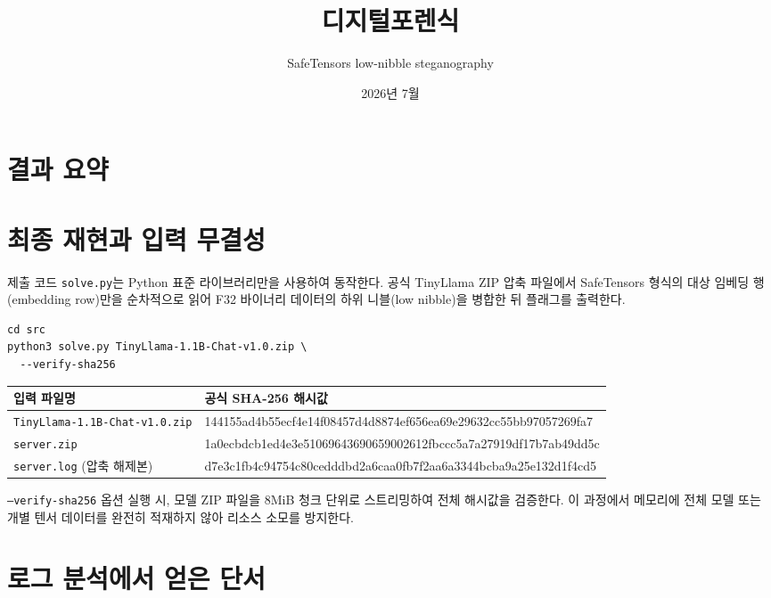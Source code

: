 \documentclass[10pt,a4paper]{article}
\title{디지털포렌식}
\author{SafeTensors low-nibble steganography}
\date{2026년 7월}
\begin{document}
\maketitle

\section*{결과 요약}

\begin{center}
\end{center}

\section{최종 재현과 입력 무결성}

제출 코드 \texttt{solve.py}는 Python 표준 라이브러리만을 사용하여 동작한다. 공식 TinyLlama ZIP 압축 파일에서 SafeTensors 형식의 대상 임베딩 행(embedding row)만을 순차적으로 읽어 F32 바이너리 데이터의 하위 니블(low nibble)을 병합한 뒤 플래그를 출력한다.

\begin{lstlisting}
cd src
python3 solve.py TinyLlama-1.1B-Chat-v1.0.zip \
  --verify-sha256
\end{lstlisting}

\begin{tabularx}{\linewidth}{@{}lX@{}}
\toprule
입력 파일명 & 공식 SHA-256 해시값\\
\midrule
\texttt{TinyLlama-1.1B-Chat-v1.0.zip} &
\ttfamily\footnotesize
144155ad4b55ecf4e14f08457d4d8874ef656ea69e29632cc55bb97057269fa7\\
\texttt{server.zip} &
\ttfamily\footnotesize
1a0ecbdcb1ed4e3e51069643690659002612fbccc5a7a27919df17b7ab49dd5c\\
\texttt{server.log} (압축 해제본) &
\ttfamily\footnotesize
d7e3c1fb4c94754c80cedddbd2a6caa0fb7f2aa6a3344bcba9a25e132d1f4cd5\\
\bottomrule
\end{tabularx}

\texttt{--verify-sha256} 옵션 실행 시, 모델 ZIP 파일을 8MiB 청크 단위로 스트리밍하여 전체 해시값을 검증한다. 이 과정에서 메모리에 전체 모델 또는 개별 텐서 데이터를 완전히 적재하지 않아 리소스 소모를 방지한다.

\section{로그 분석에서 얻은 단서}
\end{document}
